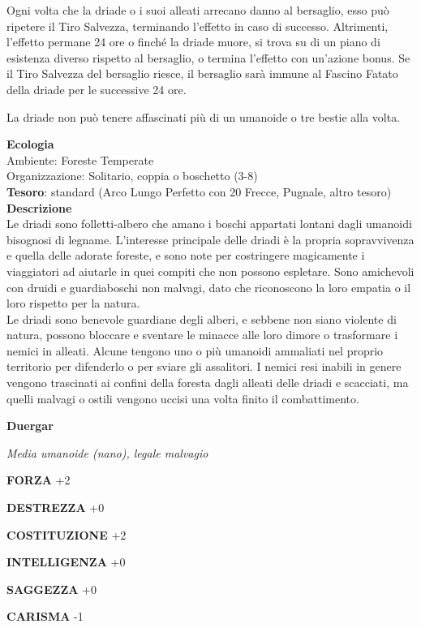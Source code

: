 \begin{multicols}{2}
	Ogni volta che la driade o i suoi alleati arrecano danno al bersaglio, esso può ripetere il Tiro Salvezza, terminando l'effetto in caso di successo. Altrimenti, l'effetto permane 24 ore o finché la driade muore, si trova su di un piano di esistenza diverso rispetto al bersaglio, o termina l'effetto con un'azione bonus. Se il Tiro Salvezza del bersaglio riesce, il bersaglio sarà immune al Fascino Fatato della driade per le successive 24 ore.

	La driade non può tenere affascinati più di un umanoide o tre bestie alla volta.

	\textbf{Ecologia}\\
	Ambiente: Foreste Temperate\\
	Organizzazione: Solitario, coppia o boschetto (3-8)\\
	\textbf{Tesoro}: standard (Arco Lungo Perfetto con 20 Frecce, Pugnale, altro tesoro)\\
	\textbf{Descrizione}\\
	Le driadi sono folletti-albero che amano i boschi appartati lontani dagli umanoidi bisognosi di legname. L'interesse principale delle driadi è la propria sopravvivenza e quella delle adorate foreste, e sono note per costringere magicamente i viaggiatori ad aiutarle in quei compiti che non possono espletare. Sono amichevoli con druidi e guardiaboschi non malvagi, dato che riconoscono la loro empatia o il loro rispetto per la natura.\\
	Le driadi sono benevole guardiane degli alberi, e sebbene non siano violente di natura, possono bloccare e sventare le minacce alle loro dimore o trasformare i nemici in alleati. Alcune tengono uno o più umanoidi ammaliati nel proprio territorio per difenderlo o per sviare gli assalitori. I nemici resi inabili in genere vengono trascinati ai confini della foresta dagli alleati delle driadi e scacciati, ma quelli malvagi o ostili vengono uccisi una volta finito il combattimento.

	\medskip{}\textbf{Duergar}

	\textit{Media umanoide (nano), legale malvagio}

	\textbf{FORZA} +2

	\textbf{DESTREZZA} +0

	\textbf{COSTITUZIONE} +2

	\textbf{INTELLIGENZA} +0

	\textbf{SAGGEZZA} +0

	\textbf{CARISMA} -1


\end{multicols}
